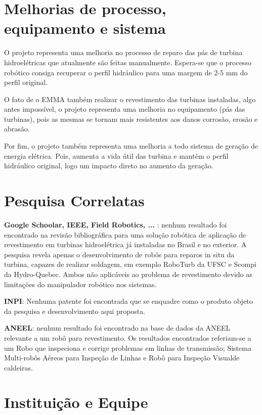 \section{Melhorias de processo, equipamento e sistema}

O projeto representa uma melhoria no processo de reparo das pás de turbina
hidroelétricas que atualmente são feitas manualmente. Espera-se que o processo
robótico consiga recuperar o perfil hidráulico para uma margem de 2-5 mm do perfil original.

O fato de o EMMA também realizar o revestimento das turbinas instaladas, algo
antes impossível, o projeto representa uma melhoria no equipamento (pás das
turbinas), pois as mesmas se tornam mais resistentes aos danos corrosão, erosão e abrasão.

Por fim, o projeto também representa uma melhoria a todo sistema de geração de
energia elétrica. Pois, aumenta a vida útil das turbina e mantêm o perfil
hidráulico original, logo um impacto direto no aumento da geração.

\section{Pesquisa Correlatas}

\textbf{Google Schoolar, IEEE, Field Robotics, ... }: nenhum resultado foi
encontrado na revisão bibliográfica para uma solução robótica de aplicação de
revestimento em turbinas hidroelétrica já instaladas no Brasil e no exterior. A
pesquisa revela apenas o desenvolvimento de robôs para reparos in situ da
turbina, capazes de realizar soldagem, em exemplo RoboTurb da UFSC e Scompi da
Hydro-Quebec. Ambos não aplicáveis ao problema de revestimento devido as
limitações do manipulador robótico nos sistemas.

\textbf{INPI}: Nenhuma patente foi encontrada que se enquadre como o produto
objeto da pesquisa e desenvolvimento aqui proposta.

\textbf{ANEEL}: nenhum resultado foi encontrado na base de dados da ANEEL
relevante a um robô para revestimento. Os resultados encontrados referiam-se a
um Robo que inspeciona e corrige problemas em linhas de transmissão; Sistema
Multi-robôs Aéreos para Inspeção de Linhas e Robô para Inspeção Visualde
caldeiras.

\section{Instituição e Equipe}

